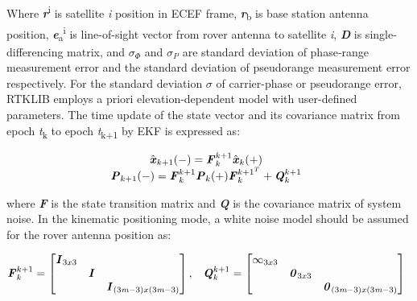 Where \textbf{\textit{r}}\textsuperscript{i} is satellite \textit{i} position in ECEF frame, \textbf{\textit{r}}\textsubscript{b} is base station antenna position, \textbf{\textit{e}}\textsubscript{a}\textsuperscript{i} is line-of-sight vector from rover
antenna to satellite \textit{i}, \textbf{\textit{D}} is single-differencing matrix, and $\sigma_{\Phi}$ and $\sigma_{P}$ are standard deviation of phase‐range measurement error and the standard deviation of pseudorange measurement error respectively.  For the standard deviation $\sigma$ of carrier-phase or pseudorange error, RTKLIB employs a priori elevation-dependent model with user-defined parameters. 
The time update of the state vector and its covariance matrix from epoch \textit{t}\textsubscript{k} to epoch \textit{t}\textsubscript{k+1} by EKF is expressed as:

\begin{equation}
\begin{matrix}
    \hat{\textbf{\textit{x}}}_{k+1}(-) = \textbf{\textit{F}}_{k}^{k+1} \hat{\textbf{\textit{x}}}_{k}(+)\\
    \textbf{\textit{P}}_{k+1}(-)=\textbf{\textit{F}}_{k}^{k+1}\textbf{\textit{P}}_{k}(+) \textbf{\textit{F}}_{k}^{{k+1}^{T}} + \textbf{\textit{Q}}_{k}^{k+1}\\
\end{matrix}
\\
\label{eq:EKF_rtklib_tupdate}
\end{equation}

where \textbf{\textit{F}} is the state transition matrix and \textbf{\textit{Q}} is the covariance matrix of system noise. 
In the kinematic positioning mode, a white noise model should be assumed for the rover antenna position as:

\begin{equation}
    \begin{matrix}
        \textbf{\textit{F}}_{k}^{k+1}=\begin{bmatrix}
        \textbf{\textit{I}}_{3x3} & & \\
        & \textbf{\textit{I}} & \\
        & & \textbf{\textit{I}}_{(3\textit{m}-3) x(3\textit{m}-3)}\\
        \end{bmatrix}, & \textbf{\textit{Q}}_{k}^{k+1} =\begin{bmatrix}
        \infty_{3x3} & & \\
        &  \textbf{\textit{0}}_{3x3} & \\
        & &  \textbf{\textit{0}}_{(3\textit{m}-3) x(3\textit{m}-3)}\\
        \end{bmatrix}
    \end{matrix}
\\
\label{eq:EKF_rtklib_FQ}
\end{equation}

